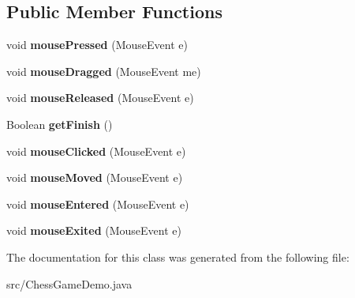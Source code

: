 \subsection*{Public Member Functions}
\begin{DoxyCompactItemize}
\item 
\hypertarget{class_chess_game_demo_ab52c4364333b4e4ec27bd731c7b2256f}{void {\bfseries mouse\-Pressed} (Mouse\-Event e)}\label{class_chess_game_demo_ab52c4364333b4e4ec27bd731c7b2256f}

\item 
\hypertarget{class_chess_game_demo_a20232f9f79c24183355215d5d9fb97f8}{void {\bfseries mouse\-Dragged} (Mouse\-Event me)}\label{class_chess_game_demo_a20232f9f79c24183355215d5d9fb97f8}

\item 
\hypertarget{class_chess_game_demo_a4ed6a1f2ef893a991284314aff24ccdd}{void {\bfseries mouse\-Released} (Mouse\-Event e)}\label{class_chess_game_demo_a4ed6a1f2ef893a991284314aff24ccdd}

\item 
\hypertarget{class_chess_game_demo_a72b1027bb8e3c6e29a098408e0e800f6}{Boolean {\bfseries get\-Finish} ()}\label{class_chess_game_demo_a72b1027bb8e3c6e29a098408e0e800f6}

\item 
\hypertarget{class_chess_game_demo_a004e02ac96f039240269badbf2d08b8c}{void {\bfseries mouse\-Clicked} (Mouse\-Event e)}\label{class_chess_game_demo_a004e02ac96f039240269badbf2d08b8c}

\item 
\hypertarget{class_chess_game_demo_a91cb907f923dafdfc2e98b4a0d64f608}{void {\bfseries mouse\-Moved} (Mouse\-Event e)}\label{class_chess_game_demo_a91cb907f923dafdfc2e98b4a0d64f608}

\item 
\hypertarget{class_chess_game_demo_a5adfb134fa4f1f85c234fac389408eca}{void {\bfseries mouse\-Entered} (Mouse\-Event e)}\label{class_chess_game_demo_a5adfb134fa4f1f85c234fac389408eca}

\item 
\hypertarget{class_chess_game_demo_a37c5d938478f8ff26d889db218343cb9}{void {\bfseries mouse\-Exited} (Mouse\-Event e)}\label{class_chess_game_demo_a37c5d938478f8ff26d889db218343cb9}

\end{DoxyCompactItemize}


The documentation for this class was generated from the following file\-:\begin{DoxyCompactItemize}
\item 
src/Chess\-Game\-Demo.\-java\end{DoxyCompactItemize}
